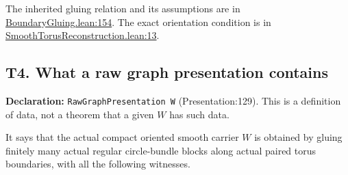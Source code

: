 \documentclass[
  letterpaper,
  11pt]{article}
\begin{document}
The inherited gluing relation and its assumptions are in
\href{https://github.com/qinz1yang/differential-geometry-dev/blob/ea0fae60ee01ef8c8d9b57a51794c6538f679c5d/DifferentialGeometry/Topology/Attachment/BoundaryGluing.lean\#L154}{BoundaryGluing.lean:154}.
The exact orientation condition is in
\href{https://github.com/qinz1yang/differential-geometry-dev/blob/ea0fae60ee01ef8c8d9b57a51794c6538f679c5d/DifferentialGeometry/Topology/ThreeManifold/Geometrization/SmoothTorusReconstruction.lean\#L13}{SmoothTorusReconstruction.lean:13}.

\subsection{T4. What a raw graph presentation contains}\label{t4}

\textbf{Declaration:}
{\small\texttt{Raw\allowbreak{}Graph\allowbreak{}Presentation W}}
(Presentation:129). This is a definition of data, not a theorem that a
given \(W\) has such data.

It says that the actual compact oriented smooth carrier \(W\) is
obtained by gluing finitely many actual regular circle-bundle blocks
along actual paired torus boundaries, with all the following witnesses.
\end{document}
